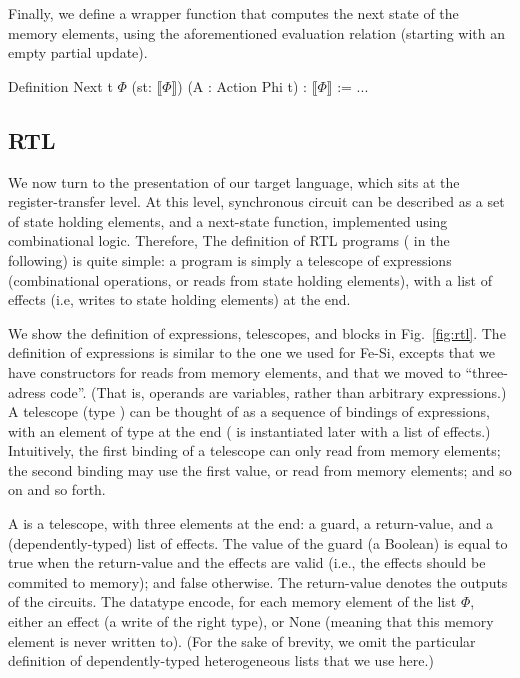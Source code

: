 \documentclass[preprint]{sigplanconf}
\newcommand{\denote}[1]{\llbracket #1 \rrbracket}
\begin{document}
Finally, we define a wrapper function that computes the next state of
the memory elements, using the aforementioned evaluation relation
(starting with an empty partial update). 
\begin{coq}
Definition Next {t} $\Phi$ (st: $\denote{\Phi}$) (A : Action Phi t) : $\denote{\Phi}$ := ...
\end{coq}

\subsection{RTL} 
We now turn to the presentation of our target language, which sits at
the register-transfer level. At this level, synchronous circuit can be
described as a set of state holding elements, and a next-state
function, implemented using combinational logic.  
%
Therefore, The definition of RTL programs ( in the
following) is quite simple: a program is simply a telescope of
expressions (combinational operations, or reads from state holding
elements), with a list of effects (i.e, writes to state holding
elements) at the end.

We show the definition of expressions, telescopes, and blocks in
Fig.~\ref{fig:rtl}. 
%
The definition of expressions is similar to the one we used for Fe-Si,
excepts that we have constructors for reads from memory elements, and
that we moved to ``three-adress code''.
%
(That is, operands are variables, rather than arbitrary expressions.)
%
A telescope (type ) can be thought of as a sequence of
bindings of expressions, with an element of type  at the
end ( is instantiated later with a list of effects.)
%
Intuitively, the first binding of a telescope can only read from
memory elements; the second binding may use the first value, or read
from memory elements; and so on and so forth.

A  is a telescope, with three elements at the end: a
guard, a return-value, and a (dependently-typed) list of effects. 
%
The value of the guard (a Boolean) is equal to true when the
return-value and the effects are valid (i.e., the effects should be
commited to memory); and false otherwise.
%
The return-value denotes the outputs of the circuits. 
%
The datatype  encode, for each memory element of the
list $\Phi$, either an effect (a write of the right type), or None
(meaning that this memory element is never written to). (For the sake
of brevity, we omit the particular definition of dependently-typed
heterogeneous lists  that we use here.)
\end{document}
